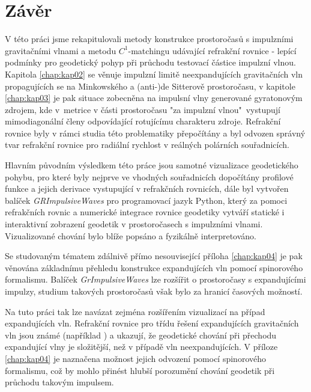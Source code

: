 \chapter*{Závěr}

V této práci jsme rekapitulovali metody konstrukce prostoročasů s impulzními gravitačními vlnami
a metodu $C^1$-matchingu udávající refrakční rovnice - lepící podmínky pro geodetický pohyp při průchodu
testovací částice impulzní vlnou. Kapitola \ref{chap:kap02} se věnuje impulzní limitě neexpandujících
gravitačních vln propagujících se na Minkowského a (anti-)de Sitterově prostoročasu, v kapitole \ref{chap:kap03}
je pak situace zobecněna na impulsní vlny generované gyratonovým zdrojem, kde v~metrice v části prostoročasu "za impulzní vlnou"\
vystupují mimodiagonální členy odpovídající rotujícímu charakteru zdroje.
Refrakční rovnice byly v rámci studia této problematiky přepočítány a byl odvozen správný tvar refrakční rovnice
pro radiální rychlost v reálných polárních souřadnicích.

Hlavním původním výsledkem této práce jsou samotné vizualizace geodetického pohybu, pro které byly nejprve ve vhodných souřadnicích dopočítány
profilové funkce a jejich derivace vystupující v refrakčních rovnicích, dále byl vytvořen balíček \textit{GRImpulsiveWaves} pro programovací jazyk
Python, který za pomoci refrakčních rovnic a numerické integrace rovnice geodetiky
vytváří statické i interaktivní zobrazení geodetik v prostoročasech s impulzními vlnami.
Vizualizované chování bylo blíže popsáno a fyzikálně interpretováno.

Se studovaným tématem zdálnivě přímo nesouvisející příloha \ref{chap:kap04} je pak věnována základnímu přehledu konstrukce expandujících vln pomocí spinorového formalismu.
Balíček \emph{GrImpulsiveWaves} lze rozšířit o prostoročasy s expandujícími impulzy, studium takových prostoročasů však bylo
za hranicí časových možností.

Na tuto práci tak lze navázat zejména rozšířením vizualizací na případ expandujících vln. Refrakční rovnice pro
třídu řešení expandujících gravitačních vln jsou známé (například \cite{Podolsky:2016mqg}) a ukazují, že
geodetické chování při přechodu expandující vlny je složitější, než v případě vln neexpandujících. V příloze \ref{chap:kap04}
je naznačena možnost jejich odvození pomocí spinorového formalismu, což by mohlo přinést hlubší porozumění chování geodetik
při průchodu takovým impulsem.

\clearpage
